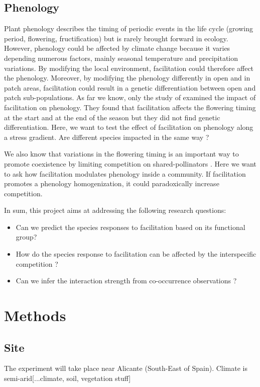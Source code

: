 \documentclass[12pt]{article} %
\begin{document}
\subsection{Phenology}
Plant phenology describes the timing of periodic events in the life cycle (growing period, flowering, fructification) but is rarely brought forward in ecology.
However, phenology could be affected by climate change \citep{Cleland2007} because it varies depending numerous factors, mainly seasonal temperature and precipitation variations. By modifying the local environment, facilitation could therefore affect the phenology. Moreover, by modifying the phenology differently in open and in patch areas, facilitation could result in a genetic differentiation between open and patch sub-populations. As far we know, only the study of \citet{Castellanos2014} examined the impact of facilitation on phenology. They found that facilitation affects the flowering timing at the start and at the end of the season but they did not find genetic differentiation. Here, we want to test the effect of facilitation on phenology along a stress gradient. Are different species impacted in the same way ?

We also know that variations in the flowering timing is an important way to promote coexistence by limiting competition on shared-pollinators \citep{Cleland2006}. Here we want to ask how facilitation modulates phenology inside a community. If facilitation promotes a phenology homogenization, it could paradoxically increase competition. 

In sum, this project aims at addressing the following research questions:
\begin{itemize}
	\item Can we predict the species responses to facilitation based on its functional group? 
	\item How do the species response to facilitation can be affected by the interspecific competition ?
	\item Can we infer the interaction strength from co-occurrence observations ?
\end{itemize}


\section{Methods}
\subsection{Site}
The experiment will take place near Alicante (South-East of Spain). Climate is semi-arid[...climate, soil, vegetation stuff]
\end{document}
